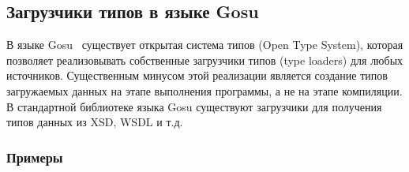 \subsection{Загрузчики типов в языке Gosu}\label{gosu-type-loaders}
В языке Gosu~\cite{gosuguide} существует открытая система типов (Open Type System), которая позволяет реализовывать собственные загрузчики типов (type loaders) для любых источников.
Существенным минусом этой реализации является создание типов загружаемых данных на этапе выполнения программы, а не на этапе компиляции.
В стандартной библиотеке языка Gosu существуют загрузчики для получения типов данных из XSD, WSDL и т.д.

\subsubsection{Примеры}

